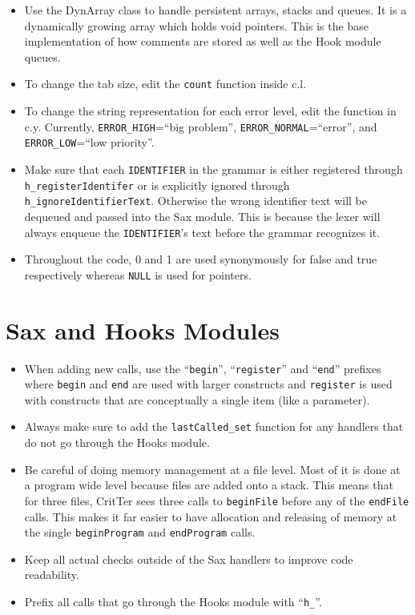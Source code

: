 \documentclass[12pt]{report}
\newcommand{\programName}{CritTer\xspace}
\begin{document}
\begin{itemize}
\item Use the DynArray class to handle persistent arrays, stacks and queues. It is a dynamically growing array which holds void pointers. This is the base implementation of how comments are stored as well as the Hook module queues.
\item To change the tab size, edit the \lstinline{count} function inside c.l.
\item To change the string representation for each error level, edit the \lyyerror function in c.y. Currently, \lstinline{ERROR_HIGH}=``big problem'', \lstinline{ERROR_NORMAL}=``error'', and \lstinline{ERROR_LOW}=``low priority''.  
\item Make sure that each \lstinline{IDENTIFIER} in the grammar is either registered through \lstinline{h_registerIdentifer} or is explicitly ignored through \lstinline{h_ignoreIdentifierText}. Otherwise the wrong identifier text will be dequeued and passed into the Sax module. This is because the lexer will always enqueue the \lstinline{IDENTIFIER}'s text before the grammar recognizes it.
\item Throughout the code, 0 and 1 are used synonymously for false and true respectively whereas \lstinline{NULL} is used for pointers.
\end{itemize}

\section{Sax and Hooks Modules}

\begin{itemize}
\item When adding new calls, use the ``\lstinline{begin}'', ``\lstinline{register}'' and ``\lstinline{end}'' prefixes where \lstinline{begin} and \lstinline{end} are used with larger constructs and \lstinline{register} is used with constructs that are conceptually a single item (like a parameter).
\item Always make sure to add the \lstinline{lastCalled_set} function for any handlers that do not go through the Hooks module.
\item Be careful of doing memory management at a file level. Most of it is done at a program wide level because files are added onto a stack. This means that for three files, \programName sees three calls to \lstinline{beginFile} before any of the \lstinline{endFile} calls. This makes it far easier to have allocation and releasing of memory at the single \lstinline{beginProgram} and \lstinline{endProgram} calls.
\item Keep all actual checks outside of the Sax handlers to improve code readability.
\item Prefix all calls that go through the Hooks module with ``\lstinline{h_}''.
\end{itemize}
\end{document}
